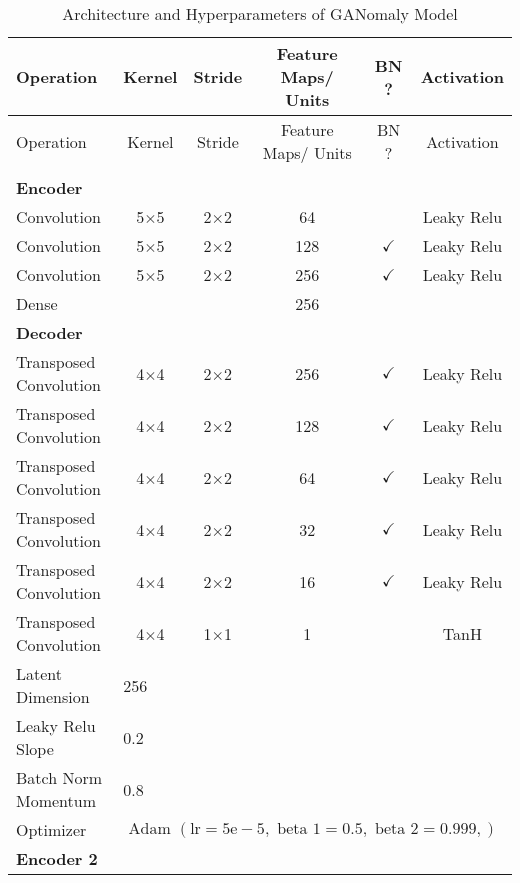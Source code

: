 \footnotesize
\begin{longtable}[c]{@{}lccccc@{}}
	\caption{Architecture and Hyperparameters of GANomaly Model}
	\label{tab:ganomaly_imp}\\
	\toprule
	Operation & Kernel & Stride & Feature Maps/ Units & BN ? & Activation \\* \midrule
	\endfirsthead
	\toprule
	Operation & Kernel & Stride & Feature Maps/ Units & BN ? & Activation \\* \midrule
	\endhead
	\bottomrule
	\endfoot
	\endlastfoot
	\multicolumn{6}{l}{\textbf{Generator}} \\
	\multicolumn{6}{l}{\textbf{Encoder}} \\
	Convolution & \multicolumn{1}{c}{5$\times$5} & 2$\times$2 & 64 &  & Leaky Relu \\
	Convolution & \multicolumn{1}{c}{5$\times$5} & 2$\times$2 & 128 & $\checkmark$ & Leaky Relu \\
	Convolution & \multicolumn{1}{c}{5$\times$5} & 2$\times$2 & 256 & $\checkmark$ & Leaky Relu \\
	Dense & \multicolumn{1}{c}{} &  & 256 &  &  \\ 
	\multicolumn{6}{l}{\textbf{Decoder}} \\
	Transposed Convolution & \multicolumn{1}{c}{4$\times$4} & 2$\times$2 & 256 & $\checkmark$ & Leaky Relu \\
	Transposed Convolution & \multicolumn{1}{c}{4$\times$4} & 2$\times$2 & 128 & $\checkmark$ & Leaky Relu \\
	Transposed Convolution & \multicolumn{1}{c}{4$\times$4} & 2$\times$2 & 64 & $\checkmark$ & Leaky Relu \\
	Transposed Convolution & \multicolumn{1}{c}{4$\times$4} & 2$\times$2 & 32 & $\checkmark$ & Leaky Relu \\
	Transposed Convolution & \multicolumn{1}{c}{4$\times$4} & 2$\times$2 & 16 & $\checkmark$ & Leaky Relu \\
	Transposed Convolution & \multicolumn{1}{c}{4$\times$4} & 1$\times$1 & 1 &  & TanH \\ \hline
	Latent Dimension & \multicolumn{5}{l}{256} \\
	Leaky Relu Slope & \multicolumn{5}{l}{0.2} \\
	Batch Norm Momentum & \multicolumn{5}{l}{0.8} \\
	Optimizer & \multicolumn{5}{l}{$\text { Adam }(\mathrm{lr}=5 \mathrm{e}-5, \text { beta } 1=0.5, \text { beta } 2=0.999,)$} \\ \hline
	\multicolumn{6}{l}{\textbf{Encoder 2}} \\

\end{longtable}
